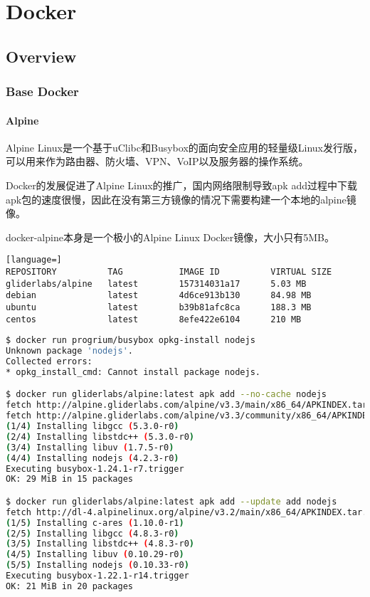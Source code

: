 \part{Docker}

\chapter{Overview}


\section{Base Docker}



\subsection{Alpine}


Alpine Linux是一个基于uClibc和Busybox的面向安全应用的轻量级Linux发行版，可以用来作为路由器、防火墙、VPN、VoIP以及服务器的操作系统。

Docker的发展促进了Alpine Linux的推广，国内网络限制导致apk add过程中下载apk包的速度很慢，因此在没有第三方镜像的情况下需要构建一个本地的alpine镜像。

docker-alpine本身是一个极小的Alpine Linux Docker镜像，大小只有5MB。

\begin{lstlisting}[language=]
REPOSITORY          TAG           IMAGE ID          VIRTUAL SIZE
gliderlabs/alpine   latest        157314031a17      5.03 MB
debian              latest        4d6ce913b130      84.98 MB
ubuntu              latest        b39b81afc8ca      188.3 MB
centos              latest        8efe422e6104      210 MB
\end{lstlisting}


\begin{lstlisting}[language=bash]
$ docker run progrium/busybox opkg-install nodejs
Unknown package 'nodejs'.
Collected errors:
* opkg_install_cmd: Cannot install package nodejs.

$ docker run gliderlabs/alpine:latest apk add --no-cache nodejs
fetch http://alpine.gliderlabs.com/alpine/v3.3/main/x86_64/APKINDEX.tar.gz
fetch http://alpine.gliderlabs.com/alpine/v3.3/community/x86_64/APKINDEX.tar.gz
(1/4) Installing libgcc (5.3.0-r0)
(2/4) Installing libstdc++ (5.3.0-r0)
(3/4) Installing libuv (1.7.5-r0)
(4/4) Installing nodejs (4.2.3-r0)
Executing busybox-1.24.1-r7.trigger
OK: 29 MiB in 15 packages

$ docker run gliderlabs/alpine:latest apk add --update add nodejs
fetch http://dl-4.alpinelinux.org/alpine/v3.2/main/x86_64/APKINDEX.tar.gz
(1/5) Installing c-ares (1.10.0-r1)
(2/5) Installing libgcc (4.8.3-r0)
(3/5) Installing libstdc++ (4.8.3-r0)
(4/5) Installing libuv (0.10.29-r0)
(5/5) Installing nodejs (0.10.33-r0)
Executing busybox-1.22.1-r14.trigger
OK: 21 MiB in 20 packages
\end{lstlisting}

